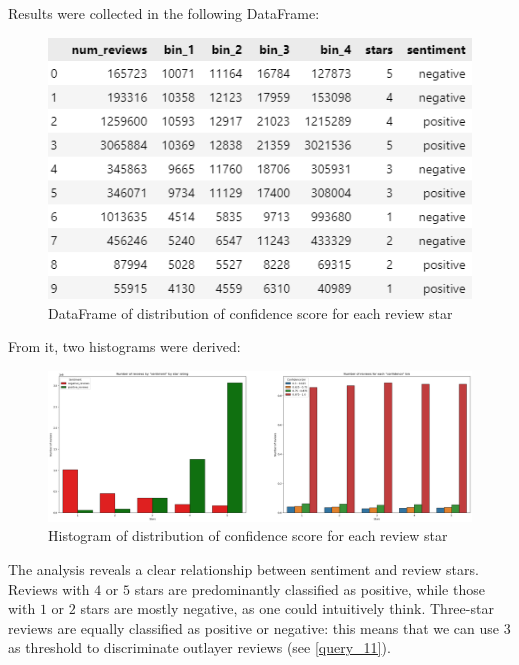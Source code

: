 \documentclass{Configuration_Files/PoliMi3i_thesis}
\begin{document}
Results were collected in the following DataFrame:

\bigskip

\begin{figure}[H]
    \centering
    \includegraphics[width=3\columnwidth / 4]{imgs/query_10b.png}
    \caption{DataFrame of distribution of confidence score for each review star}
    \label{fig:query_10b}
\end{figure}

\bigskip

From it, two histograms were derived: 

\bigskip

\begin{figure}[H]
    \centering
    \includegraphics[width=\columnwidth]{imgs/query_10.png}
    \caption{Histogram of distribution of confidence score for each review star}
    \label{fig:query_10}
\end{figure}

\bigskip

The analysis reveals a clear relationship between sentiment and review stars. Reviews with $4$ or $5$ stars are predominantly classified as positive, while those with $1$ or $2$ stars are mostly negative, as one could intuitively think. Three-star reviews are equally classified as positive or negative: this means that we can use $3$ as threshold to discriminate outlayer reviews (see \ref{query_11}).
\end{document}
